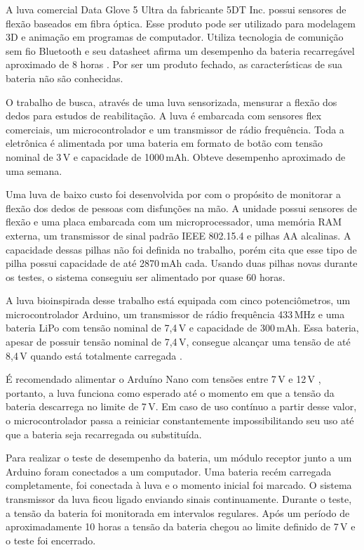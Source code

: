 \documentclass[
	12pt,				%
	openright,			%
	oneside,			%
	a4paper,			%
	english,			%
	brazil				%
	]{abntex2}
\begin{document}
			A luva comercial Data Glove 5 Ultra da fabricante 5DT Inc. possui sensores de flexão baseados em fibra óptica. Esse produto pode ser utilizado para modelagem 3D e animação em programas de computador. Utiliza tecnologia de comunição sem fio Bluetooth e seu datasheet afirma um desempenho da bateria recarregável aproximado de 8 horas \cite{5DT-ultra}. Por ser um produto fechado, as características de sua bateria não são conhecidas.

			O trabalho de \cite{michela2013rehab} busca, através de uma luva sensorizada, mensurar a flexão dos dedos para estudos de reabilitação. A luva é embarcada com sensores flex comerciais, um microcontrolador e um transmissor de rádio frequência. Toda a eletrônica é alimentada por uma bateria em formato de botão com tensão nominal de 3$\,$V e capacidade de 1000$\,$mAh. Obteve desempenho aproximado de uma semana.
			
			Uma luva de baixo custo foi desenvolvida por \cite{simone2007lowcost} com o propósito de monitorar a flexão dos dedos de pessoas com disfunções na mão. A unidade possui sensores de flexão e uma placa embarcada com um microprocessador, uma memória RAM externa, um transmissor de sinal padrão IEEE 802.15.4 e pilhas AA alcalinas. A capacidade dessas pilhas não foi definida no trabalho, porém \cite{buchmann2016batteries} cita que esse tipo de pilha possui capacidade de até 2870$\,$mAh cada. Usando duas pilhas novas durante os testes, o sistema conseguiu ser alimentado por quase 60 horas.

			A luva bioinspirada desse trabalho está equipada com cinco potenciômetros, um microcontrolador Arduino, um transmissor de rádio frequência 433$\,$MHz e uma bateria LiPo com tensão nominal de 7,4$\,$V e capacidade de 300$\,$mAh. Essa bateria, apesar de possuir tensão nominal de 7,4$\,$V, consegue alcançar uma tensão de até 8,4$\,$V quando está totalmente carregada \cite{buchmann2016batteries}.

			É recomendado alimentar o Arduíno Nano com tensões entre 7$\,$V e 12$\,$V \cite{arduinopowerrange}, portanto, a luva funciona como esperado até o momento em que a tensão da bateria descarrega no limite de 7$\,$V. Em caso de uso contínuo a partir desse valor, o microcontrolador passa a reiniciar constantemente impossibilitando seu uso até que a bateria seja recarregada ou substituída.

			Para realizar o teste de desempenho da bateria, um módulo receptor junto a um Arduino foram conectados a um computador. Uma bateria recém carregada completamente, foi conectada à luva e o momento inicial foi marcado. O sistema transmissor da luva ficou ligado enviando sinais continuamente. Durante o teste, a tensão da bateria foi monitorada em intervalos regulares. Após um período de aproximadamente 10 horas a tensão da bateria chegou ao limite definido de 7$\,$V e o teste foi encerrado.
\end{document}
